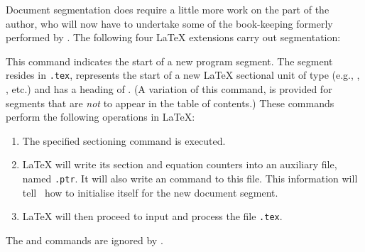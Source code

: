 \html{\\}\noindent
Document segmentation does require a little more work on the
part of the author, who will now have to undertake some
of the book-keeping formerly performed by \latextohtml.
The following four \LaTeX{} extensions carry out segmentation:

\begin{htmllist}%
%
%
\item [ \Lc{segment\char123}\Meta{file}\texttt{\char125\char123}\Meta{sec-type}%
 \texttt{\char125\char123}\Meta{heading}\texttt{\char125}\label{intsegment}]
%
This command indicates the start of a new program segment.
The segment resides in \texttt{.tex}, represents the start
of a new \LaTeX{} sectional unit of type 
(e.g., , , etc.) and has a heading
of .  (A variation  of this command, 
is provided for segments that are \emph{not} to appear in the table of contents.)\html{\\}  
These commands perform the following operations in \LaTeX:
%
\begin{enumerate}
\item 
The specified sectioning command is executed.
\item 
\LaTeX{} will write its section and equation counters
into an auxiliary file, named \texttt{.ptr}.  It will also
write an  command to this file.  This
information will tell \latextohtml\ how to initialise itself
for the new document segment.
\item 
\LaTeX{} will then proceed to input and process the file \texttt{.tex}.
\end{enumerate}
The  and  commands are ignored by
\latextohtml.


\end{htmllist}
